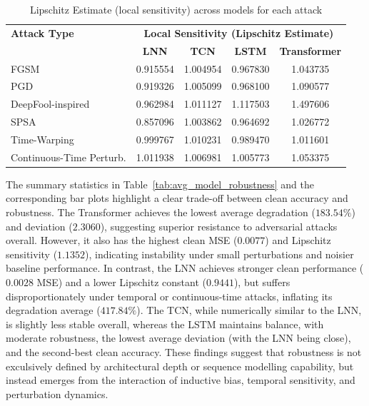 \begin{table}[H]
    \centering
    \small
    \begin{tabular}{|l|cccc|}
    \hline
    \textbf{Attack Type} & \multicolumn{4}{c|}{\textbf{Local Sensitivity (Lipschitz Estimate)}} \\
    \cline{2-5}
     & \textbf{LNN} & \textbf{TCN} & \textbf{LSTM} & \textbf{Transformer} \\
    \hline
    FGSM                     & 0.915554 & 1.004954 & 0.967830 & 1.043735 \\
    PGD                      & 0.919326 & 1.005099 & 0.968100 & 1.090577 \\
    DeepFool-inspired        & 0.962984 & 1.011127 & 1.117503 & 1.497606 \\
    SPSA                     & 0.857096 & 1.003862 & 0.964692 & 1.026772 \\
    Time-Warping             & 0.999767 & 1.010231 & 0.989470 & 1.011601 \\
    Continuous-Time Perturb. & 1.011938 & 1.006981 & 1.005773 & 1.053375 \\
    \hline
    \end{tabular}
    \caption{Lipschitz Estimate (local sensitivity) across models for each attack}
    \label{tab:attack_results_sensitivity}
\end{table}

The summary statistics in Table~\ref{tab:avg_model_robustness} and the corresponding bar plots highlight a clear trade-off between clean accuracy and robustness. The Transformer achieves the lowest average degradation ($183.54\%$) and deviation ($2.3060$), suggesting superior resistance to adversarial attacks overall. However, it also has the highest clean MSE ($0.0077$) and Lipschitz sensitivity ($1.1352$), indicating instability under small perturbations and noisier baseline performance. In contrast, the LNN achieves stronger clean performance ($0.0028$ MSE) and a lower Lipschitz constant ($0.9441$), but suffers disproportionately under temporal or continuous-time attacks, inflating its degradation average ($417.84\%$). The TCN, while numerically similar to the LNN, is slightly less stable overall, whereas the LSTM maintains balance, with moderate robustness, the lowest average deviation (with the LNN being close), and the second-best clean accuracy. These findings suggest that robustness is not exculsively defined by architectural depth or sequence modelling capability, but instead emerges from the interaction of inductive bias, temporal sensitivity, and perturbation dynamics.

